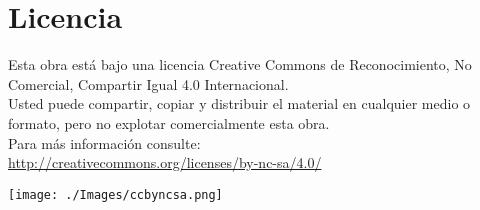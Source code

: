 \thispagestyle{empty}

\chapter{Licencia}

Esta obra está bajo una licencia Creative Commons de Reconocimiento, No Comercial, Compartir Igual 4.0 Internacional. \\

 Usted puede compartir, copiar y distribuir el material en cualquier medio o formato, pero no explotar comercialmente esta obra. \\

Para más información consulte: \\ \url{http://creativecommons.org/licenses/by-nc-sa/4.0/}

\texttt{[image: ./Images/ccbyncsa.png]}